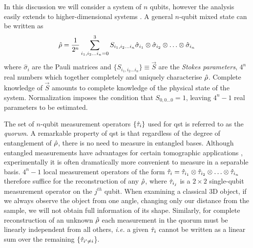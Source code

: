 In this discussion we will consider a system of $n$ qubits, however the analysis easily extends to higher-dimensional systems \cite{Paris2004}. 
A general $n$-qubit mixed state can be written as 
\begin{equation}
    \hat{\rho} = \frac{1}{2^n} \sum_{i_1, i_2 \ldots i_n = 0}^{3} 
    S_{i_1, i_2 \ldots i_n} \hat{\sigma}_{i_1} \otimes \hat{\sigma}_{i_2} \otimes \ldots
    \otimes \hat{\sigma}_{i_n}
    \label{eqn:general_mixed_state}
\end{equation}
where $\hat{\sigma}_i$ are the Pauli matrices and $\{ S_{i_1, i_2 \ldots i_n} \} \equiv \vec{S}$ are the \emph{Stokes parameters}, $4^n$ real numbers which together completely and uniquely characterise $\hat{\rho}$. Complete knowledge of $\vec{S}$ amounts to complete knowledge of the physical state of the system.  Normalization imposes the condition that $S_{0,0\ldots0}=1$, leaving $4^n-1$ real parameters to be estimated. 


The set of $n$-qubit measurement operators $\{\hat{\tau}_i\}$ used for \gls{qst} is referred to as the \emph{quorum}. 
A remarkable property of \gls{qst} is that regardless of the degree of entanglement of $\hat{\rho}$, there is no need to measure in entangled bases. 
Although entangled measurements have advantages for certain tomographic applications \cite{AshleyMontanaro2013}, experimentally it is often dramatically more convenient to measure in a separable basis.  $4^n-1$ local measurement operators of the form $\hat{\tau}_i = \hat{\tau}_{i_1} \otimes \hat{\tau}_{i_2} \otimes \ldots \otimes \hat{\tau}_{i_n}$  therefore suffice for the reconstruction of any $\hat{\rho}$, where $\hat{\tau}_{i_j}$ is a $2\times 2$ single-qubit measurement operator on the $j^{th}$ qubit.  When examining a classical 3D object, if we always observe the object from one angle, changing only our distance from the sample, we will not obtain full information of its shape. Similarly, for complete reconstruction of an unknown $\hat{\rho}$ each measurement in the quorum must be linearly independent from all others, \emph{i.e.} a given $\hat{\tau}_i$ cannot be written as a linear sum over the remaining $\{\hat{\tau}_{i'\ne i}$\}.  

